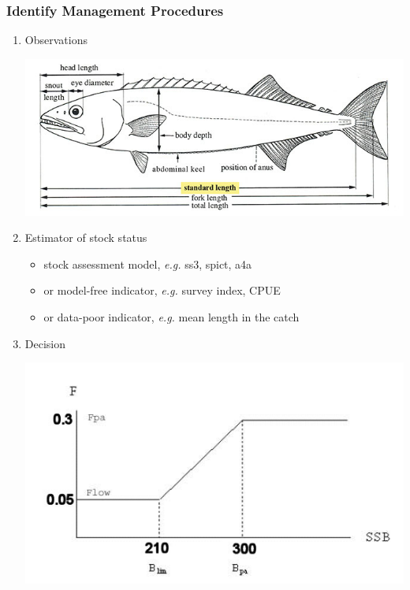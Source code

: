 \documentclass{beamer}
\begin{document}
\begin{frame}
\frametitle{Identify Management Procedures}

\begin{enumerate}
	
	\item 
	\begin{minipage}[c]{0.7\textwidth} %
		Observations
	\end{minipage}%
	\hfill
	\begin{minipage}[c]{0.75\textwidth} %
		\centering
		\includegraphics[height=0.18\textheight]{figs/sample}
	\end{minipage}

\bigskip

	\item Estimator of stock status
		\begin{itemize}
			\item stock assessment model, \emph{e.g.} ss3, spict, a4a
			\item or model-free indicator, \emph{e.g.} survey index, CPUE
			\item or data-poor indicator, \emph{e.g.} mean length in the catch 
		\end{itemize}
	
\bigskip

	\item 
	\begin{minipage}[c]{0.7\textwidth}
		Decision
	\end{minipage}%
	\hfill
	\begin{minipage}[c]{0.75\textwidth}
		\centering
		\includegraphics[height=0.25\textheight]{figs/hcr.png}
	\end{minipage}
	
\end{enumerate}

\end{frame}
\end{document}
